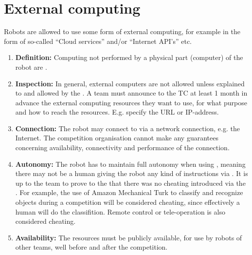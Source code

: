 \section{External computing}\label{rule:robot_external_computing}
Robots are allowed to use some form of external computing, for example in the form of so-called ``Cloud services'' and/or ``Internet API's'' etc. 
\begin{enumerate}
	\item \textbf{Definition:} Computing not performed by a physical part (computer) of the robot are . 
	\item \textbf{Inspection:} In general, external computers are not allowed unless explained to and allowed by the .
	  A team must announce to the TC at least 1 month in advance the external computing resources they want to use, for what purpose and how to reach the resources.
	  E.g. specify the URL or IP-address. 
	\item \textbf{Connection:} The robot may connect to  via a network connection, e.g. the Internet. 
	  The competition organisation cannot make any guarantees concerning availability, connectivity and performance of the connection. 
	\item \textbf{Autonomy:} The robot has to maintain full autonomy when using , 
	  meaning there may not be a human giving the robot any kind of instructions via .
	  It is up to the team to prove to the  that there was no cheating introduced via the . 
	  For example, the use of Amazon Mechanical Turk to classify and recognize objects during a competition will be considered cheating, since effectively a human will do the classifition. 
	  Remote control or tele-operation is also considered cheating. 
	\item \textbf{Availability:} The resources must be publicly available, for use by robots of other teams, well before and after the competition.
\end{enumerate}


 

